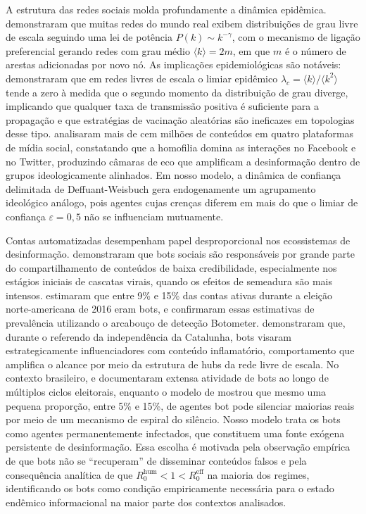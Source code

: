 \documentclass[12pt,a4paper]{article}
\theoremstyle{definition}
\theoremstyle{plain}
\begin{document}
A estrutura das redes sociais molda profundamente a dinâmica epidêmica. \citet{barabasi1999emergence} demonstraram que muitas redes do mundo real exibem distribuições de grau livre de escala seguindo uma lei de potência $P(k) \sim k^{-\gamma}$, com o mecanismo de ligação preferencial gerando redes com grau médio $\langle k \rangle = 2m$, em que $m$ é o número de arestas adicionadas por novo nó. As implicações epidemiológicas são notáveis: \citet{pastor2001epidemic} demonstraram que em redes livres de escala o limiar epidêmico $\lambda_c = \langle k \rangle/\langle k^2 \rangle$ tende a zero à medida que o segundo momento da distribuição de grau diverge, implicando que qualquer taxa de transmissão positiva é suficiente para a propagação e que estratégias de vacinação aleatórias são ineficazes em topologias desse tipo. \citet{cinelli2021echo} analisaram mais de cem milhões de conteúdos em quatro plataformas de mídia social, constatando que a homofilia domina as interações no Facebook e no Twitter, produzindo câmaras de eco que amplificam a desinformação dentro de grupos ideologicamente alinhados. Em nosso modelo, a dinâmica de confiança delimitada de Deffuant-Weisbuch \citep{deffuant2000mixing} gera endogenamente um agrupamento ideológico análogo, pois agentes cujas crenças diferem em mais do que o limiar de confiança $\varepsilon = 0{,}5$ não se influenciam mutuamente.

Contas automatizadas desempenham papel desproporcional nos ecossistemas de desinformação. \citet{shao2018spread} demonstraram que bots sociais são responsáveis por grande parte do compartilhamento de conteúdos de baixa credibilidade, especialmente nos estágios iniciais de cascatas virais, quando os efeitos de semeadura são mais intensos. \citet{bessi2016social} estimaram que entre 9\% e 15\% das contas ativas durante a eleição norte-americana de 2016 eram bots, e \citet{varol2017online} confirmaram essas estimativas de prevalência utilizando o arcabouço de detecção Botometer. \citet{stella2018bots} demonstraram que, durante o referendo da independência da Catalunha, bots visaram estrategicamente influenciadores com conteúdo inflamatório, comportamento que amplifica o alcance por meio da estrutura de hubs da rede livre de escala. No contexto brasileiro, \citet{ruediger2018bots} e \citet{arnaudo2017computational} documentaram extensa atividade de bots ao longo de múltiplos ciclos eleitorais, enquanto o modelo de \citet{ross2019spread} mostrou que mesmo uma pequena proporção, entre 5\% e 15\%, de agentes bot pode silenciar maiorias reais por meio de um mecanismo de espiral do silêncio. Nosso modelo trata os bots como agentes permanentemente infectados, que constituem uma fonte exógena persistente de desinformação. Essa escolha é motivada pela observação empírica de que bots não se ``recuperam'' de disseminar conteúdos falsos e pela consequência analítica de que $R_0^{\text{hum}} < 1 < R_0^{\text{eff}}$ na maioria dos regimes, identificando os bots como condição empiricamente necessária para o estado endêmico informacional na maior parte dos contextos analisados.
\end{document}
